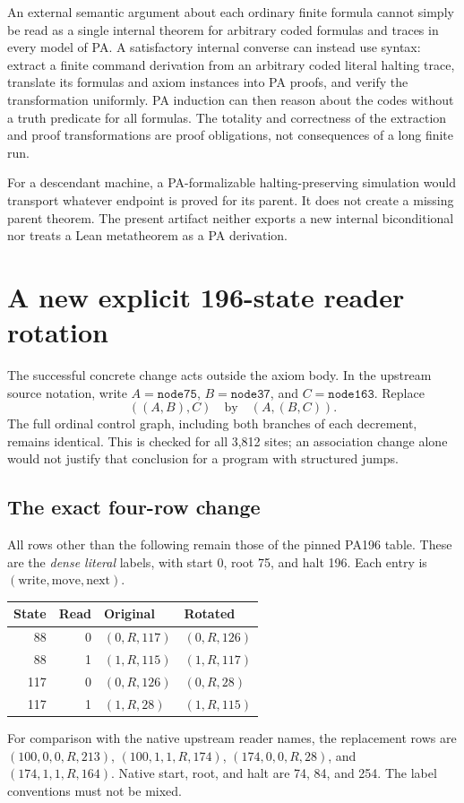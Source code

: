 An external semantic argument about each ordinary finite formula cannot
simply be read as a single internal theorem for arbitrary coded formulas
and traces in every model of PA. A satisfactory internal converse can
instead use syntax: extract a finite command derivation from an arbitrary
coded literal halting trace, translate its formulas and axiom instances
into PA proofs, and verify the transformation uniformly. PA induction can
then reason about the codes without a truth predicate for all formulas.
The totality and correctness of the extraction and proof transformations
are proof obligations, not consequences of a long finite run.

For a descendant machine, a PA-formalizable halting-preserving simulation
would transport whatever endpoint is proved for its parent. It does not
create a missing parent theorem. The present artifact neither exports a
new internal biconditional nor treats a Lean metatheorem as a PA derivation.

\section{A new explicit 196-state reader rotation}\label{sec:rotated}

The successful concrete change acts outside the axiom body. In the upstream
source notation, write $A=\texttt{node75}$, $B=\texttt{node37}$, and
$C=\texttt{node163}$. Replace
\[
 ((A,B),C)\quad\text{by}\quad(A,(B,C)).
\]
The full ordinal control graph, including both branches of each decrement,
remains identical. This is checked for all 3,812 sites; an association change
alone would not justify that conclusion for a program with structured jumps.

\subsection{The exact four-row change}

All rows other than the following remain those of the pinned PA196 table.
These are the \emph{dense literal} labels, with start 0, root 75, and halt
196. Each entry is $(\text{write},\text{move},\text{next})$.
\begin{center}
\begin{tabular}{@{}rrll@{}}
\toprule
State & Read & Original & Rotated\\
\midrule
88&0&$(0,R,117)$&$(0,R,126)$\\
88&1&$(1,R,115)$&$(1,R,117)$\\
117&0&$(0,R,126)$&$(0,R,28)$\\
117&1&$(1,R,28)$&$(1,R,115)$\\
\bottomrule
\end{tabular}
\end{center}
For comparison with the native upstream reader names, the replacement rows
are $(100,0,0,R,213)$, $(100,1,1,R,174)$,
$(174,0,0,R,28)$, and $(174,1,1,R,164)$.
Native start, root, and halt are 74, 84, and 254. The label conventions must
not be mixed.

